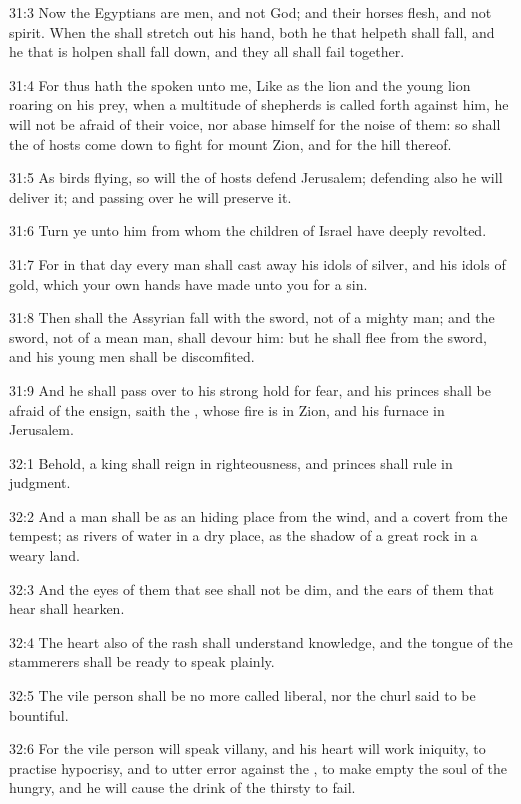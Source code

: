 31:3 Now the Egyptians are men, and not God; and their horses flesh, and not spirit. When the \LORD shall stretch out his hand, both he that helpeth shall fall, and he that is holpen shall fall down, and they all shall fail together.

31:4 For thus hath the \LORD spoken unto me, Like as the lion and the young lion roaring on his prey, when a multitude of shepherds is called forth against him, he will not be afraid of their voice, nor abase himself for the noise of them: so shall the \LORD of hosts come down to fight for mount Zion, and for the hill thereof.

31:5 As birds flying, so will the \LORD of hosts defend Jerusalem; defending also he will deliver it; and passing over he will preserve it.

31:6 Turn ye unto him from whom the children of Israel have deeply revolted.

31:7 For in that day every man shall cast away his idols of silver, and his idols of gold, which your own hands have made unto you for a sin.

31:8 Then shall the Assyrian fall with the sword, not of a mighty man; and the sword, not of a mean man, shall devour him: but he shall flee from the sword, and his young men shall be discomfited.

31:9 And he shall pass over to his strong hold for fear, and his princes shall be afraid of the ensign, saith the \LORD, whose fire is in Zion, and his furnace in Jerusalem.

32:1 Behold, a king shall reign in righteousness, and princes shall rule in judgment.

32:2 And a man shall be as an hiding place from the wind, and a covert from the tempest; as rivers of water in a dry place, as the shadow of a great rock in a weary land.

32:3 And the eyes of them that see shall not be dim, and the ears of them that hear shall hearken.

32:4 The heart also of the rash shall understand knowledge, and the tongue of the stammerers shall be ready to speak plainly.

32:5 The vile person shall be no more called liberal, nor the churl said to be bountiful.

32:6 For the vile person will speak villany, and his heart will work iniquity, to practise hypocrisy, and to utter error against the \LORD, to make empty the soul of the hungry, and he will cause the drink of the thirsty to fail.

